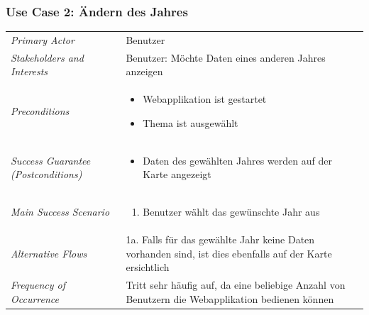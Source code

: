\subsubsection{Use Case 2: Ändern des Jahres}

\renewcommand{\arraystretch}{2}
\begin{longtable}{p{0.25\twocelltabwidth}p{0.75\twocelltabwidth}}
\textit{Primary Actor} & Benutzer \\ 
\textit{Stakeholders and Interests} & Benutzer: Möchte Daten eines anderen Jahres anzeigen \\ 
\textit{Preconditions} & \begin{itemize}[noitemsep, nosep, leftmargin=12pt, before*={\mbox{}\vspace{-\baselineskip}}, after*={\mbox{}\vspace{-\baselineskip}}]
\item Webapplikation ist gestartet
\item Thema ist ausgewählt
\end{itemize} \\ 
\textit{Success Guarantee (Postconditions)} & \begin{itemize}[noitemsep, nosep, leftmargin=12pt, before*={\mbox{}\vspace{-\baselineskip}}, after*={\mbox{}\vspace{-\baselineskip}}]
\item Daten des gewählten Jahres werden auf der Karte angezeigt
\end{itemize} \\ 
\textit{Main Success Scenario} & \begin{enumerate}[noitemsep, nosep, leftmargin=12pt, before*={\mbox{}\vspace{-\baselineskip}}, after*={\mbox{}\vspace{-\baselineskip}}]
\item Benutzer wählt das gewünschte Jahr aus
\end{enumerate} \\ 
\textit{Alternative Flows} & 1a. Falls für das gewählte Jahr keine Daten vorhanden sind, ist dies ebenfalls auf der Karte ersichtlich \\ 
\textit{Frequency of Occurrence} & Tritt sehr häufig auf, da eine beliebige Anzahl von Benutzern die Webapplikation bedienen können \\ 
\end{longtable} 
\renewcommand{\arraystretch}{1.3}


